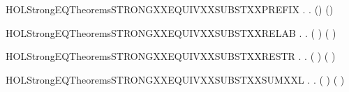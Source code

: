 \newcommand{\HOLStrongEQTheoremsSTRONGXXEQUIVXXSUBSTXXPARXXR}{\UseVerbatim{HOLStrongEQTheoremsSTRONGXXEQUIVXXSUBSTXXPARXXR}}
\begin{SaveVerbatim}{HOLStrongEQTheoremsSTRONGXXEQUIVXXSUBSTXXPREFIX}
\HOLTokenTurnstile{} \HOLSymConst{\HOLTokenForall{}} .    \HOLSymConst{\HOLTokenImp{}} \HOLSymConst{\HOLTokenForall{}}.  () ()
\end{SaveVerbatim}
\newcommand{\HOLStrongEQTheoremsSTRONGXXEQUIVXXSUBSTXXPREFIX}{\UseVerbatim{HOLStrongEQTheoremsSTRONGXXEQUIVXXSUBSTXXPREFIX}}
\begin{SaveVerbatim}{HOLStrongEQTheoremsSTRONGXXEQUIVXXSUBSTXXRELAB}
\HOLTokenTurnstile{} \HOLSymConst{\HOLTokenForall{}} .
          \HOLSymConst{\HOLTokenImp{}}
       \HOLSymConst{\HOLTokenForall{}}.  (  ) (  )
\end{SaveVerbatim}
\newcommand{\HOLStrongEQTheoremsSTRONGXXEQUIVXXSUBSTXXRELAB}{\UseVerbatim{HOLStrongEQTheoremsSTRONGXXEQUIVXXSUBSTXXRELAB}}
\begin{SaveVerbatim}{HOLStrongEQTheoremsSTRONGXXEQUIVXXSUBSTXXRESTR}
\HOLTokenTurnstile{} \HOLSymConst{\HOLTokenForall{}} .    \HOLSymConst{\HOLTokenImp{}} \HOLSymConst{\HOLTokenForall{}}.  (\HOLConst{\ensuremath{\nu}}  ) (\HOLConst{\ensuremath{\nu}}  )
\end{SaveVerbatim}
\newcommand{\HOLStrongEQTheoremsSTRONGXXEQUIVXXSUBSTXXRESTR}{\UseVerbatim{HOLStrongEQTheoremsSTRONGXXEQUIVXXSUBSTXXRESTR}}
\begin{SaveVerbatim}{HOLStrongEQTheoremsSTRONGXXEQUIVXXSUBSTXXSUMXXL}
\HOLTokenTurnstile{} \HOLSymConst{\HOLTokenForall{}} .
          \HOLSymConst{\HOLTokenImp{}}
       \HOLSymConst{\HOLTokenForall{}}.  ( \HOLSymConst{+} ) ( \HOLSymConst{+} )
\end{SaveVerbatim}
